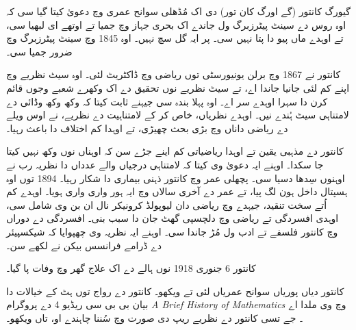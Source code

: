 \documentclass[../../../include/open-logic-section]{subfiles}
\begin{document}



گیورگ کانتور (\textsc{گے} اورگ \textsc{کان} تور) دی اک مُڈھلی سوانح عمری وچ دعویٰ کیتا گیا سی کہ اوہ روس دے سینٹ پیٹرزبرگ ول جاندے اک بحری جہاز وچ جمیا تے اوتھے ای لبھیا سی، تے اوہدے ماں پیو دا پتا نہیں سی۔ پر ایہ گل سچ نہیں۔ اوہ 1845 وچ سینٹ پیٹرزبرگ وچ ضرور جمیا سی۔

کانتور نے 1867 وچ برلن یونیورسٹی توں ریاضی وچ ڈاکٹریٹ لئی۔ اوہ سیٹ نظریے وچ اپنے کم لئی جانیا جاندا اے، تے سیٹ نظریے نوں تحقیق دے اک وکھرے شعبے وجوں قائم کرن دا سہرا اوہدے سر اے۔ اوہ پہلا بندہ سی جیہنے ثابت کیتا کہ وکھ وکھ وڈائی دے لامتناہی سیٹ ہُندے نیں۔ اوہدے نظریاں، خاص کر کے لامتناہیت دے نظریے، نے اوس ویلے دے ریاضی داناں وچ بڑی بحث چھیڑی، تے اوہدا کم اختلاف دا باعث رہیا۔

کانتور دے مذہبی یقین تے اوہدا ریاضیاتی کم اینے جڑے سن کہ اوہناں نوں وکھ نہیں کیتا جا سکدا۔ اوہنے ایہ دعویٰ وی کیتا کہ لامتناہی درجیاں والے عدداں دا نظریہ رب نے اوہنوں سِدھا دسیا سی۔ پچھلی عمر وچ کانتور ذہنی بیماری دا شکار رہیا۔ 1894 توں اوہ ہسپتال داخل ہون لگ پیا، تے عمر دے آخری سالاں وچ ایہ ہور واری واری ہویا۔ اوہدے کم اُتے سخت تنقید، جیہدے وچ ریاضی دان لیوپولڈ کرونیکر نال ان بن وی شامل سی، اوہدی افسردگی تے ریاضی وچ دلچسپی گھٹ جان دا سبب بنی۔ افسردگی دے دوراں وچ کانتور فلسفے تے ادب ول مُڑ جاندا سی۔ اوہنے ایہ نظریہ وی چھپوایا کہ شیکسپیئر دے ڈرامے فرانسس بیکن نے لکھے سن۔

کانتور 6 جنوری 1918 نوں ہالے دے اک علاج گھر وچ وفات پا گیا۔

\begin{reading}
کانتور دیاں پوریاں سوانح عمریاں لئی \citet{Dauben1990} تے \citet{Grattan-Guinness1971} ویکھو۔ کانتور دے رواج توں ہٹ کے خیالات دا بیان بی بی سی ریڈیو 4 دے پروگرام \emph{A Brief History of
  Mathematics} وچ وی ملدا اے \citep{Sautoy2014}۔ جے تسی کانتور دے نظریے ریپ دی صورت وچ سُننا چاہندے او، تاں \citet{Rose2012} ویکھو۔
\end{reading}
\end{document}
